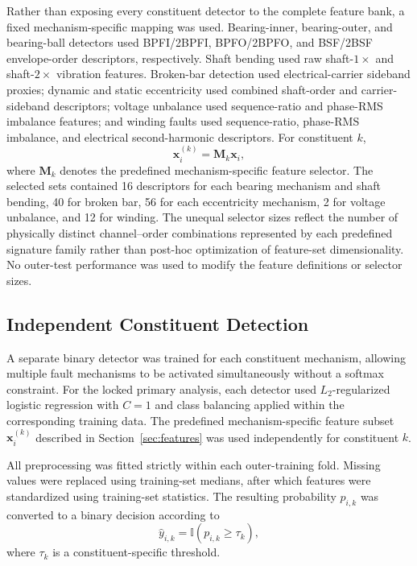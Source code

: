 Rather than exposing every constituent detector to the complete feature
bank, a fixed mechanism-specific mapping was used. Bearing-inner,
bearing-outer, and bearing-ball detectors used BPFI/2BPFI, BPFO/2BPFO, and
BSF/2BSF envelope-order descriptors, respectively. Shaft bending used raw
shaft-$1\times$ and shaft-$2\times$ vibration features. Broken-bar
detection used electrical-carrier sideband proxies; dynamic and static
eccentricity used combined shaft-order and carrier-sideband descriptors;
voltage unbalance used sequence-ratio and phase-RMS imbalance features; and
winding faults used sequence-ratio, phase-RMS imbalance, and electrical
second-harmonic descriptors. For constituent $k$,
\begin{equation}
\mathbf{x}_i^{(k)} = \mathbf{M}_k \mathbf{x}_i,
\label{eq:selector}
\end{equation}
where $\mathbf{M}_k$ denotes the predefined mechanism-specific feature
selector. The selected sets contained 16 descriptors for each bearing
mechanism and shaft bending, 40 for broken bar, 56 for each eccentricity
mechanism, 2 for voltage unbalance, and 12 for winding. The unequal
selector sizes reflect the number of physically distinct channel--order
combinations represented by each predefined signature family rather than
post-hoc optimization of feature-set dimensionality. No outer-test
performance was used to modify the feature definitions or selector sizes.

\subsection{Independent Constituent Detection}
\label{sec:detection}

A separate binary detector was trained for each constituent mechanism,
allowing multiple fault mechanisms to be activated simultaneously without a
softmax constraint. For the locked primary analysis, each detector used
$L_2$-regularized logistic regression with $C = 1$ and class balancing
applied within the corresponding training data. The predefined
mechanism-specific feature subset $\mathbf{x}_i^{(k)}$ described in
Section~\ref{sec:features} was used independently for constituent $k$.

All preprocessing was fitted strictly within each outer-training fold.
Missing values were replaced using training-set medians, after which
features were standardized using training-set statistics. The resulting
probability $p_{i,k}$ was converted to a binary decision according to
\begin{equation}
\hat{y}_{i,k} = \mathbb{I}\left(p_{i,k} \ge \tau_k\right),
\label{eq:threshold}
\end{equation}
where $\tau_k$ is a constituent-specific threshold.


